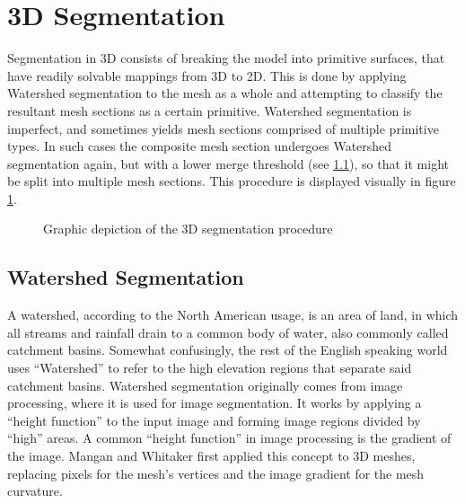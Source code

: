 \section{3D Segmentation}
Segmentation in 3D consists of breaking the model into primitive surfaces, that have readily solvable mappings from 3D to 2D.
This is done by applying Watershed segmentation to the mesh as a whole and attempting to classify the resultant mesh sections as a certain primitive.
Watershed segmentation is imperfect, and sometimes yields mesh sections comprised of multiple primitive types.
In such cases the composite mesh section undergoes Watershed segmentation again, but with a lower merge threshold (see \ref{ws_seg}), so that it might be split into multiple mesh sections.
This procedure is displayed visually in figure \ref{fig:Seg3D}.

\begin{figure}
	\centering
{}
	\caption{Graphic depiction of the 3D segmentation procedure}
	\label{fig:Seg3D}
\end{figure}

\subsection{Watershed Segmentation}\label{ws_seg}
A watershed, according to the North American usage, is an area of land, in which all streams and rainfall drain to a common body of water\cite{USGS_Watersheds}, also commonly called catchment basins.
Somewhat confusingly, the rest of the English speaking world uses ``Watershed'' to refer to the high elevation regions that separate said catchment basins.
Watershed segmentation originally comes from image processing, where it is used for image segmentation\cite{ImageSegWS, DigitalImageProc}.
It works by applying a ``height function'' to the input image and forming image regions divided by ``high'' areas.
A common ``height function'' in image processing is the gradient of the image\cite{ImageSegWS}.
Mangan and Whitaker first applied this concept to 3D meshes, replacing pixels for the mesh's vertices and the image gradient for the mesh curvature\cite{Watershed}.

